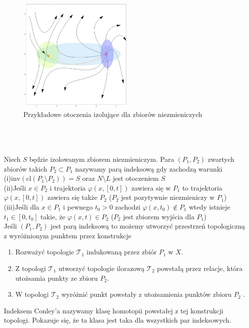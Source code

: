 \documentclass[12pt,a4paper]{article}
\begin{document}
\begin{figure}[H]
    \centering
   \includegraphics[width=0.5\textwidth]
   {IndexConley'a1Izolacje.jpg}
    \caption{Przykładowe otoczenia izolujące dla zbiorów niezmieniczych}
    \label{rys:index2}
\end{figure}
\\
\\
\\Niech $S$ będzie izolowanym zbiorem niezmieniczym. Para $(P_1,P_2)$ zwartych zbiorów takich $P_2\subset P_1$ nazywamy parą indeksową gdy zachodzą warunki
\\(i)$\text{inv}(\text{cl}(P_1\setminus P_2))=S$ oraz $N\setminus L$ jest otoczeniem $S$  
\\(ii)Jeśli $x\in P_2$ i trajektoria $\varphi(x,[0,t])$ zawiera się w $P_1$ to trajektoria $\varphi(x,[0,t])$ zawiera się także $P_2$ ($P_2$ jest pozytywnie niezmieniczy w $P_1$)
\\(iii)Jeśli dla $x\in P_1$ i pewnego $t_0>0$ zachodzi $\varphi(x,t_0)\not\in P_1$ wtedy istnieje $t_1\in[0,t_0]$ takie, że $\varphi(x,t)\in P_2$ ($P_2$ jest zbiorem wyjścia dla $P_1$)
\\
Jeśli $(P_1 ,P_2)$ jest parą indeksową to możemy utworzyć przestrzeń topologiczną z wyróżnionym punktem przez konstrukcje
\begin{enumerate}
\item Rozważyć topologie $\mathcal{T}_1$ indukowaną przez zbiór $P_1$ w $X$.
\item Z topologi $\mathcal{T}_1$ utworzyć topologie ilorazową $\mathcal{T}_2$ powstałą przez relacje, która utożsamia punkty ze zbioru $P_2$.
\item W topologi $\mathcal{T}_2$ wyróżnić punkt powstały z utożsamienia punktów zbioru $P_2$ .
\end{enumerate}
 Indeksem Conley'a nazywamy klasę homotopii powstałej z tej konstrukcji topologi. Pokazuje się, że ta klasa jest taka dla wszystkich par indeksowych.
\end{document}
